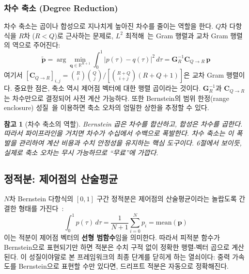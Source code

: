 \documentclass[11pt]{article}
\newtheorem{remark}{참고}
\begin{document}
\subsubsection{차수 축소 (Degree Reduction)}

차수 축소는 곱이나 합성으로 지나치게 높아진 차수를 줄이는 역할을 한다.
$Q$차 다항식을 $R$차 ($R < Q$)로 근사하는 문제로,
$L^2$ 최적해~\cite{ait2016bernstein}는 Gram 행렬과 교차 Gram 행렬의 역으로 주어진다:
\begin{equation}
  \tilde{\mathbf{p}} = \arg\min_{\mathbf{q} \in \mathbb{R}^{R+1}}
    \int_0^1 \bigl|p(\tau) - q(\tau)\bigr|^2 \, d\tau
  = \mathbf{G}_R^{-1} \mathbf{C}_{Q \to R} \, \mathbf{p}
  \label{eq:reduction}
\end{equation}
여기서 $[\mathbf{C}_{Q \to R}]_{i,j} = \binom{R}{i}\binom{Q}{j} / [\binom{R+Q}{i+j}(R+Q+1)]$은
교차 Gram 행렬이다.
중요한 점은, 축소 역시 제어점 벡터에 대한 행렬 곱이라는 것이다.
$\mathbf{G}_R^{-1}$과 $\mathbf{C}_{Q \to R}$는 차수만으로 결정되어 사전 계산 가능하다.
또한 Bernstein의 범위 한정(range enclosure) 성질~\cite{farouki2008pythagorean}을 이용하면
축소 오차의 엄밀한 상한을 추정할 수 있다.

\begin{remark}[차수 축소의 역할]
Bernstein 곱은 차수를 합산하고, 합성은 차수를 곱한다.
따라서 파이프라인을 거치면 차수가 수십에서 수백으로 폭발한다.
차수 축소는 이 폭발을 관리하여 계산 비용과 수치 안정성을 유지하는 핵심 도구이다.
6절에서 보이듯, 실제로 축소 오차는 무시 가능하므로 ``무료''에 가깝다.
\end{remark}

\subsection{정적분: 제어점의 산술평균}

$N$차 Bernstein 다항식의 $[0,1]$ 구간 정적분은
제어점의 산술평균이라는 놀랍도록 간결한 형태를 가진다~\cite{report004}:
\begin{equation}
  \int_0^1 p(\tau)\,d\tau = \frac{1}{N+1}\sum_{i=0}^N p_i
  = \mathrm{mean}(\mathbf{p})
  \label{eq:definite-integral}
\end{equation}
이는 적분이 제어점 벡터의 \textbf{선형 범함수}임을 의미한다.
따라서 피적분 함수가 Bernstein으로 표현되기만 하면
적분은 수치 구적 없이 정확한 행렬-벡터 곱으로 계산된다.
이 성질이야말로 본 프레임워크의 최종 단계를 닫히게 하는 열쇠이다:
중력 가속도를 Bernstein으로 표현할 수만 있다면, 드리프트 적분은 자동으로 정확해진다.

\end{document}
